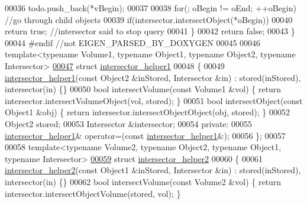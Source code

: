 \begin{DoxyCode}
00036         todo.push\_back(*vBegin);
00037 
00038     \textcolor{keywordflow}{for}(; oBegin != oEnd; ++oBegin) \textcolor{comment}{//go through child objects}
00039       \textcolor{keywordflow}{if}(intersector.intersectObject(*oBegin))
00040         \textcolor{keywordflow}{return} \textcolor{keyword}{true}; \textcolor{comment}{//intersector said to stop query}
00041   \}
00042   \textcolor{keywordflow}{return} \textcolor{keyword}{false};
00043 \}
00044 \textcolor{preprocessor}{#endif //not EIGEN\_PARSED\_BY\_DOXYGEN}
00045 
00046 \textcolor{keyword}{template}<\textcolor{keyword}{typename} Volume1, \textcolor{keyword}{typename} Object1, \textcolor{keyword}{typename} Object2, \textcolor{keyword}{typename} Intersector>
\hyperlink{struct_eigen_1_1internal_1_1intersector__helper1}{00047} \textcolor{keyword}{struct }\hyperlink{struct_eigen_1_1internal_1_1intersector__helper1}{intersector\_helper1}
00048 \{
00049   \hyperlink{struct_eigen_1_1internal_1_1intersector__helper1}{intersector\_helper1}(\textcolor{keyword}{const} Object2 &inStored, Intersector &in) : stored(inStored), 
      intersector(in) \{\}
00050   \textcolor{keywordtype}{bool} intersectVolume(\textcolor{keyword}{const} Volume1 &vol) \{ \textcolor{keywordflow}{return} intersector.intersectVolumeObject(vol, stored); \}
00051   \textcolor{keywordtype}{bool} intersectObject(\textcolor{keyword}{const} Object1 &obj) \{ \textcolor{keywordflow}{return} intersector.intersectObjectObject(obj, stored); \}
00052   Object2 stored;
00053   Intersector &intersector;
00054 \textcolor{keyword}{private}:
00055   \hyperlink{struct_eigen_1_1internal_1_1intersector__helper1}{intersector\_helper1}& operator=(\textcolor{keyword}{const} \hyperlink{struct_eigen_1_1internal_1_1intersector__helper1}{intersector\_helper1}&);
00056 \};
00057 
00058 \textcolor{keyword}{template}<\textcolor{keyword}{typename} Volume2, \textcolor{keyword}{typename} Object2, \textcolor{keyword}{typename} Object1, \textcolor{keyword}{typename} Intersector>
\hyperlink{struct_eigen_1_1internal_1_1intersector__helper2}{00059} \textcolor{keyword}{struct }\hyperlink{struct_eigen_1_1internal_1_1intersector__helper2}{intersector\_helper2}
00060 \{
00061   \hyperlink{struct_eigen_1_1internal_1_1intersector__helper2}{intersector\_helper2}(\textcolor{keyword}{const} Object1 &inStored, Intersector &in) : stored(inStored), 
      intersector(in) \{\}
00062   \textcolor{keywordtype}{bool} intersectVolume(\textcolor{keyword}{const} Volume2 &vol) \{ \textcolor{keywordflow}{return} intersector.intersectObjectVolume(stored, vol); \}

\end{DoxyCode}
